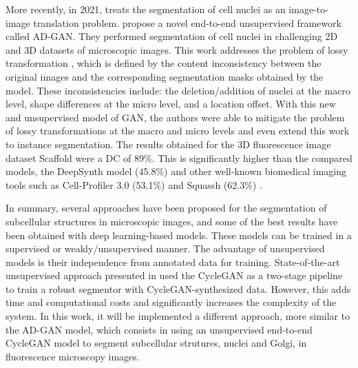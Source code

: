 More recently, in 2021, \cite{adgan} treats the segmentation of cell nuclei as an image-to-image translation problem. \citet{adgan} propose a novel end-to-end unsupervised framework called \ac{AD-GAN}. They performed segmentation of cell nuclei in challenging \ac{2D} and \ac{3D} datasets of microscopic images. This work addresses the problem of lossy transformation \cite{lossy:cyclegan}, which is defined by the content inconsistency between the original images and the corresponding segmentation masks obtained by the model. These inconsistencies include: the deletion/addition of nuclei at the macro level, shape differences at the micro level, and a location offset. With this new and unsupervised model of \ac{GAN}, the authors were able to mitigate the problem of lossy transformations at the macro and micro levels and even extend this work to instance segmentation. The results obtained for the \ac{3D} fluorescence image dataset Scaffold \cite{dataset} were a \ac{DC} of 89\%. This is significantly higher than the compared models, the DeepSynth model \cite{deepsynth} (45.8\%) and other well-known biomedical imaging tools such as Cell-Profiler 3.0 \cite{cellprofiler} (53.1\%) and Squassh (62.3\%) \cite{squassh}.

In summary, several approaches have been proposed for the segmentation of subcellular structures in microscopic images, and some of the best results have been obtained with deep learning-based models. These models can be trained in a supervised or weakly/unsupervised manner. The advantage of unsupervised models is their independence from annotated data for training. State-of-the-art unsupervised approach presented in \cite{deepsynth} used the CycleGAN as a two-stage pipeline to train a robust segmentor with CycleGAN-synthesized data. However, this adds time and computational costs and significantly increases the complexity of the system. In this work, it will be implemented a different approach, more similar to the \ac{AD-GAN} model, which consists in using an unsupervised end-to-end CycleGAN model to segment subcellular strutures, nuclei and Golgi, in fluorescence microscopy images.

